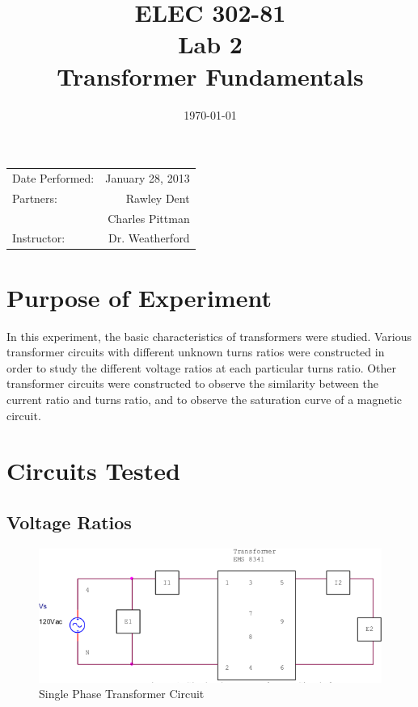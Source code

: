 \documentclass{article}
\title{ELEC 302-81\\ Lab 2\\ Transformer Fundamentals} %
\date{\today} %
\begin{document}
\maketitle

\begin{center}
  \begin{tabular}{lr}
    Date Performed: & January 28, 2013 \\
    Partners: & Rawley Dent \\
              & Charles Pittman \\
    Instructor: & Dr. Weatherford
  \end{tabular}
\end{center}

\pagebreak


\section{Purpose of Experiment}
In this experiment, the basic characteristics of transformers were studied. Various transformer circuits 
with different unknown turns ratios were constructed in order to study the different voltage ratios at each particular 
turns ratio. Other transformer circuits were constructed to observe the similarity between the current ratio 
and turns ratio, and to observe the saturation curve of a magnetic circuit.

\section{Circuits Tested}
\subsection{Voltage Ratios}
\begin{figure}[H]
  \centering
  \includegraphics[width=.8\textwidth]{img/circuit_01}
  \caption{Single Phase Transformer Circuit}
  \label{fig:circuit_01}
\end{figure}
\end{document}
